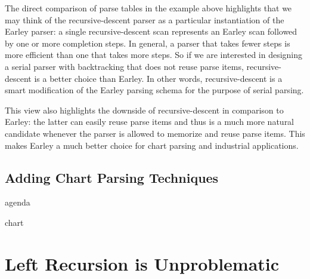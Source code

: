%
The direct comparison of parse tables in the example above highlights that we may think of the recursive-descent parser as a particular instantiation of the Earley parser: a single recursive-descent scan represents an Earley scan followed by one or more completion steps.
In general, a parser that takes fewer steps is more efficient than one that takes more steps.
So if we are interested in designing a serial parser with backtracking that does not reuse parse items, recursive-descent is a better choice than Earley.
In other words, recursive-descent is a smart modification of the Earley parsing schema for the purpose of serial parsing.

This view also highlights the downside of recursive-descent in comparison to Earley: the latter can easily reuse parse items and thus is a much more natural candidate whenever the parser is allowed to memorize and reuse parse items.
This makes Earley a much better choice for chart parsing and industrial applications.

\subsection{Adding Chart Parsing Techniques}

agenda

chart

\section{Left Recursion is Unproblematic}

